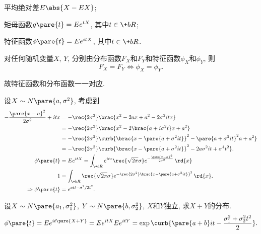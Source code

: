 \documentclass{ctexart}
\begin{document}
\begin{cenum}
    \item 平均绝对差$E\abs{X-EX}$;
    \item 矩母函数$g\pare{t} = Ee^{tX}$, 其中$t\in \+bR$;
    \item 特征函数$\phi\pare{t} = Ee^{itX}$, 其中$t\in \+bR$.
\end{cenum}
\begin{theorem}
    对任何随机变量$X$, $Y$, 分别由分布函数$F_X$和$F_Y$和特征函数$\phi_X$和$\phi_Y$, 则
    \[ F_X = F_Y \Leftrightarrow \phi_X = \phi_Y. \]
\end{theorem}
故特征函数和分布函数一一对应.
\begin{sample}
    \begin{ex}
        设$X\sim N\pare{a,\sigma^2}$, 考虑到
        \begin{align*}
            -\frac{\pare{x-a}^2}{2\sigma^2} + itx &= -\rec{2\sigma^2} \brac{x^2 - 2ax + a^2 - 2\sigma^2 itx} \\
            &= -\rec{2\sigma^2} \brac{x^2 - 2\brac{a+i\sigma^2 t}x + a^2} \\
            &= -\rec{2\sigma^2} \curb{\brac{x-\pare{a+\sigma^2 it}}^2 - \pare{a+\sigma^2it}^2 a+ a^2} \\
            &= -\rec{2\sigma^2} \curb{\brac{x-\pare{a+\sigma^2 it}}^2 - 2a\sigma^2 it + \sigma^4t^2}.\\
            \phi\pare{t} &= Ee^{itX} = \int_{\+bR} e^{itx} \rec{\sqrt{2\pi}\sigma} e^{-\frac{\pare{x-a}^2}{2\sigma^2}}\,\rd{x} \\
            1 &= \int_{\+bR} \rec{\sqrt{2\pi}\sigma}e^{-\rec{2\sigma^2}\brac{x-\pare{a+\sigma^2it}}^2}\,\rd{x}.\\
            \Rightarrow \phi\pare{t} &= e^{ait - \sigma^2/2t^2}.
        \end{align*}
    \end{ex}
\end{sample}
\begin{sample}
    \begin{ex}
        设$X\sim N\pare{a_1,\sigma_1^2}$, $Y\sim N\pare{b,\sigma_2^2}$, $X$和$Y$独立, 求$X+Y$的分布.
        \[ \displaystyle \phi\pare{t} = Ee^{it\pare{X+Y}} = Ee^{itX}Ee^{itY} = \exp\curb{\pare{a+b}it - \frac{\sigma_1^2 + \sigma_2^2t^2}{2}}. \]
    \end{ex}
\end{sample}


\end{document}
